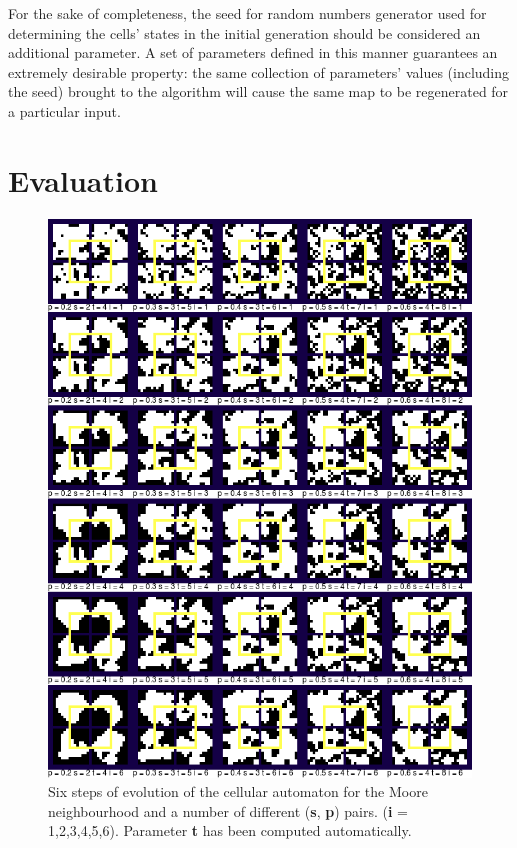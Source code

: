 \documentclass[a4paper, 11pt]{article} %
\begin{document}
For the sake of completeness, the seed for random numbers generator used for determining the cells' states in the initial generation should be considered an additional parameter. A set of parameters defined in this manner guarantees an extremely desirable property: the same collection of parameters' values (including the seed) brought to the algorithm will cause the same map to be regenerated for a particular input.


\section*{Evaluation}

\begin{figure}[ht]
	\centering
	\includegraphics[width=1.\textwidth]{moore_i}
	\caption{Six steps of evolution of the cellular automaton for the Moore neighbourhood and a number of different (\textbf{s}, \textbf{p}) pairs. (\textbf{i} = 1,2,3,4,5,6). Parameter \textbf{t} has been computed automatically.}
	\label{fig:results1}
\end{figure}
\end{document}
